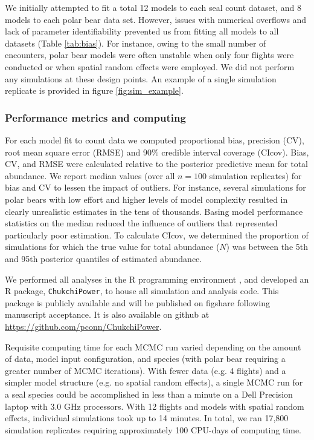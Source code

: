 \documentclass[]{rsos}%
\begin{document}
{We initially attempted to fit a total 12 models to each seal count dataset, and 8 models to each polar bear data set. However, issues with numerical overflows and lack of parameter identifiability prevented us from fitting all models to all datasets (Table \ref{tab:bias}). For instance, owing to the small number of encounters, polar bear models were often unstable when only four flights were conducted or when spatial random effects were employed.  We did not perform any simulations at these design points.  An example of a single simulation replicate is provided in figure \ref{fig:sim_example}.

\subsubsection{Performance metrics and computing}

For each model fit to count data we computed proportional bias, precision (CV), root mean square error (RMSE) and 90\% credible interval coverage (CIcov).  Bias, CV, and RMSE were calculated relative to the posterior predictive mean for total abundance.  We report median values (over all $n=100$ simulation replicates) for bias and CV to lessen the impact of outliers.  For instance, several simulations for polar bears with low effort and higher levels of model complexity resulted in clearly unrealistic estimates in the tens of thousands.  Basing model performance statistics on the median reduced the influence of outliers that represented particularly poor estimation. To calculate CIcov, we determined the proportion of simulations for which the true value for total abundance ($N$) was between the 5th and 95th posterior quantiles of estimated abundance.

We performed all analyses in the R programming environment \cite{RTeam2012}, and developed an R package, \texttt{ChukchiPower}, to house all simulation and analysis code. This package is publicly available and will be published on figshare following manuscript acceptance.  It is also available on github at \url{https://github.com/pconn/ChukchiPower}.

Requisite computing time for each MCMC run varied depending on the amount of data, model input configuration, and species (with polar bear requiring a greater number of MCMC iterations).  With fewer data (e.g. 4 flights) and a simpler model structure (e.g. no spatial random effects), a single MCMC run for a seal species could be accomplished in less than a minute on a Dell Precision laptop with 3.0 GHz processors.  With 12 flights and models with spatial random effects, individual simulations took up to 14 minutes. In total, we ran 17,800 simulation replicates requiring approximately 100 CPU-days of computing time.

}
\end{document}
